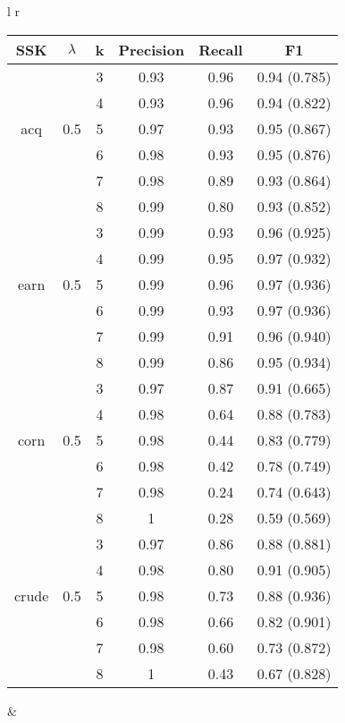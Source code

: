 \begin{tabular}{l r}
\begin{tabular}{| c | c | c | c | c | c | }
	\hline SSK&$ \lambda $& k & Precision & Recall & F1   \\ \hline


			
	
	&& 3 & 0.93 & 0.96 & 0.94 (0.785)    \\ 
	&& 4 & 0.93 & 0.96 &  0.94  (0.822)  \\
	acq	&0.5& 5 & 0.97 & 0.93 & 0.95  (0.867)   \\ 
	&& 6 & 0.98 & 0.93 & 0.95 (0.876)    \\
	&& 7 & 0.98 & 0.89 & 0.93 (0.864)    \\
	&& 8 & 0.99 & 0.80 & 0.93  (0.852)   \\\hline
	
	
	
	&& 3 & 0.99 & 0.93 & 0.96  (0.925)   \\ 
&& 4 & 0.99 & 0.95 &  0.97  (0.932) \\
earn&0.5	& 5 & 0.99 & 0.96 & 0.97   (0.936)  \\ 
&& 6 & 0.99 & 0.93 & 0.97  (0.936)   \\
&& 7 & 0.99 & 0.91 & 0.96 (0.940)    \\
&& 8 & 0.99 & 0.86 & 0.95  (0.934)   \\\hline

	
	
	
	&& 3 & 0.97 & 0.87 & 0.91  (0.665)   \\ 
	&& 4 & 0.98 & 0.64 & 0.88  (0.783)   \\ 
	corn&0.5	& 5 & 0.98 & 0.44 &  0.83  (0.779)  \\ 
	&& 6 & 0.98 & 0.42 & 0.78   (0.749)  \\ 
	&& 7 & 0.98 & 0.24 & 0.74  (0.643)  \\ 
	&& 8 & 1 & 0.28& 0.59  (0.569)   \\ \hline
	
	
	&& 3 & 0.97 & 0.86 &  0.88  (0.881)  \\ 
	&& 4 & 0.98 & 0.80 & 0.91  (0.905)   \\ 
	crude &0.5& 5 & 0.98 & 0.73 &  0.88 (0.936)   \\ 
	&& 6 & 0.98 & 0.66 &  0.82  (0.901)  \\
	&& 7 & 0.98 & 0.60 &  0.73 (0.872)  \\
	&& 8 & 1 & 0.43 &  0.67   (0.828) \\ \hline 
	
	
	
\end{tabular} &

\end{tabular} %




